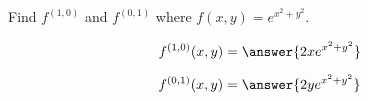\documentclass{ximera}
\author{David Guichard \and Neal Koblitz \and H. Jerome Keisler \and Albert Scheller \and Barry Balof \and Mike Wills \and Matthew Carr}
\begin{document}
\begin{exercise}




Find $f^{(1,0)}$ and $f^{(0,1)}$ where $f(x,y)=e^{x^2+y^2}$.

\begin{prompt}
\[
f^{(1,0)}(x,y)=\answer{2xe^{x^2+y^2}}
\]
\end{prompt}

\begin{prompt}
\[
f^{(0,1)}(x,y)=\answer{2ye^{x^2+y^2}}
\]
\end{prompt}

\end{exercise}
\end{document}
